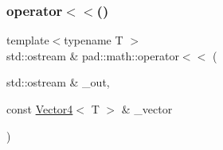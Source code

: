 \subsubsection{\texorpdfstring{operator$<$$<$()}{operator<<()}\hspace{0.1cm}{\footnotesize\ttfamily [3/3]}}
{\footnotesize\ttfamily template$<$typename T $>$ \\
std\+::ostream \& pad\+::math\+::operator$<$$<$ (\begin{DoxyParamCaption}\item[{std\+::ostream \&}]{\+\_\+out,  }\item[{const \mbox{\hyperlink{structpad_1_1math_1_1_vector4}{Vector4}}$<$ T $>$ \&}]{\+\_\+vector }\end{DoxyParamCaption})}

